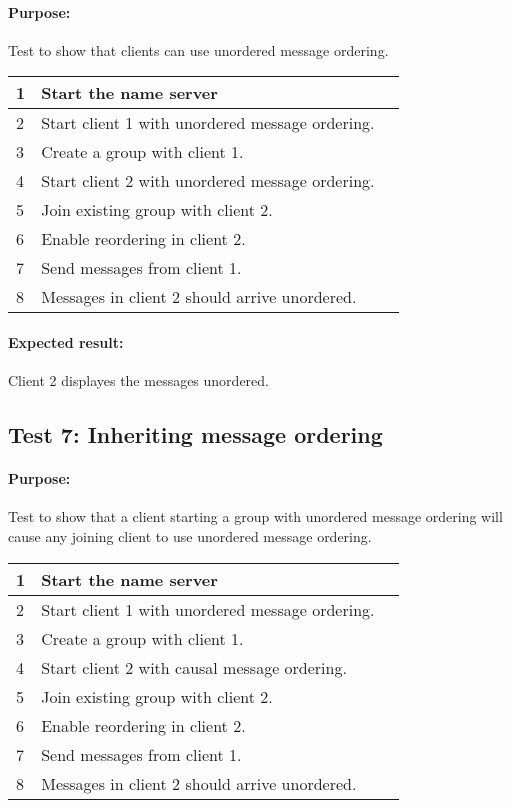 \paragraph{Purpose: } Test to show that clients can use unordered message ordering.
\begin{table}[h!]
	\begin{tabularx}{\textwidth}{|l|X|p{8pt}|}
		\hline
		1 & Start the name server & \\
		\hline
		2 & Start client 1 with unordered message ordering. & \\
		\hline
		3 & Create a group with client 1. & \\
		\hline
		4 & Start client 2 with unordered message ordering. & \\
		\hline
		5 & Join existing group with client 2.& \\
		\hline
		6 & Enable reordering in client 2. & \\
		\hline
		7 & Send messages from client 1. & \\
		\hline		
		8 & Messages in client 2 should arrive unordered.&\\
		\hline		
	\end{tabularx}
\end{table}

\paragraph{Expected result:} Client 2 displayes the messages unordered.
\pagebreak

\subsection*{Test 7: Inheriting message ordering}
\paragraph{Purpose: } Test to show that a client starting a group with unordered message ordering will cause any joining client to use unordered message ordering.
\begin{table}[h!]
	\begin{tabularx}{\textwidth}{|l|X|p{8pt}|}
		\hline
		1 & Start the name server & \\
		\hline
		2 & Start client 1 with unordered message ordering. & \\
		\hline
		3 & Create a group with client 1. & \\
		\hline
		4 & Start client 2 with causal message ordering. & \\
		\hline
		5 & Join existing group with client 2.& \\
		\hline
		6 & Enable reordering in client 2. & \\
		\hline
		7 & Send messages from client 1. & \\
		\hline		
		8 & Messages in client 2 should arrive unordered. &\\
		\hline		
	\end{tabularx}
\end{table}

